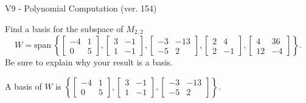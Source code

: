 \begin{exercise}
  \begin{exerciseTitle}V9 - Polynomial Computation (ver. 154)\end{exerciseTitle}
  \begin{exerciseStatement}
    Find a basis for the subspace of \(M_{2,2}\) 
\[W=\mathrm{span}\ \left\{\left[\begin{array}{cc}
-4 & 1 \\
0 & 5
\end{array}\right] , \left[\begin{array}{cc}
3 & -1 \\
1 & -1
\end{array}\right] , \left[\begin{array}{cc}
-3 & -13 \\
-5 & 2
\end{array}\right] , \left[\begin{array}{cc}
2 & 4 \\
2 & -1
\end{array}\right] , \left[\begin{array}{cc}
4 & 36 \\
12 & -4
\end{array}\right]\right\}.\]
 Be sure to explain why your result is a basis.


  \end{exerciseStatement}
  \begin{exerciseAnswer}
   A basis of \(W\) is  \(\left\{\left[\begin{array}{cc}
-4 & 1 \\
0 & 5
\end{array}\right] , \left[\begin{array}{cc}
3 & -1 \\
1 & -1
\end{array}\right] , \left[\begin{array}{cc}
-3 & -13 \\
-5 & 2
\end{array}\right]\right\}\).
  


  \end{exerciseAnswer}
\end{exercise}